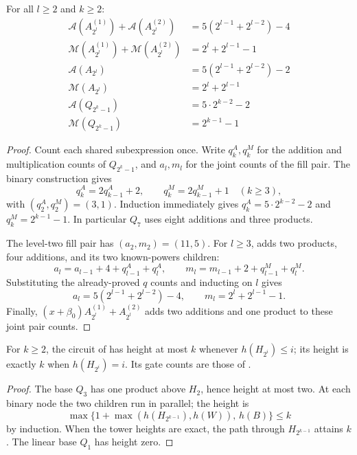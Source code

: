 \begin{lemma}\label{lem:fill-Q-count}
    For all $l\ge 2$ and $k\ge 2$:
    \begin{align}
        \mathcal{A}(A^{(1)}_{2^l}) + \mathcal{A}(A^{(2)}_{2^l})
            &= 5(2^{l - 1} + 2^{l - 2}) - 4 \\
        \mathcal{M}(A^{(1)}_{2^l}) + \mathcal{M}(A^{(2)}_{2^l})
            &= 2^l + 2^{l - 1} - 1 \\
        \mathcal{A}(A_{2^l}) &= 5(2^{l - 1} + 2^{l - 2}) - 2 \\
        \mathcal{M}(A_{2^l}) &= 2^l + 2^{l - 1} \\
        \mathcal{A}(Q_{2^k - 1}) &= 5 \cdot 2^{k - 2} - 2 \\
        \mathcal{M}(Q_{2^k - 1}) &= 2^{k - 1} - 1
    \end{align}
\end{lemma}
\begin{proof}
Count each shared subexpression once.  Write $q_k^A,q_k^M$ for the
addition and multiplication counts of $Q_{2^k-1}$, and $a_l,m_l$ for
the joint counts of the fill pair.  The binary construction gives
\begin{equation}
  q_k^A=2q_{k-1}^A+2,\qquad q_k^M=2q_{k-1}^M+1
  \quad(k\ge3),
  \label{eq:count-q-rec}
\end{equation}
with $(q_2^A,q_2^M)=(3,1)$.  Induction immediately gives
$q_k^A=5\cdot2^{k-2}-2$ and $q_k^M=2^{k-1}-1$.
In particular $Q_7$ uses eight additions and three products.

The level-two fill pair has $(a_2,m_2)=(11,5)$.  For $l\ge3$,
 adds two products, four additions, and its two
known-powers children:
\begin{equation}
  a_l=a_{l-1}+4+q_{l-1}^A+q_l^A,\qquad
  m_l=m_{l-1}+2+q_{l-1}^M+q_l^M.
  \label{eq:count-a-rec}
\end{equation}
Substituting the already-proved $q$ counts and inducting on $l$ gives
\[
  a_l=5(2^{l-1}+2^{l-2})-4,\qquad
  m_l=2^l+2^{l-1}-1.
\]
Finally, $(x+\beta_0)A^{(1)}_{2^l}+A^{(2)}_{2^l}$ adds two additions
and one product to these joint pair counts.
\end{proof}

\begin{lemma}
\label{lem:peeled-Q-count}
For $k\ge2$, the circuit of  has height at
most $k$ whenever $h(H_{2^i})\le i$; its height is exactly $k$ when
$h(H_{2^i})=i$.  Its gate counts are those of .
\end{lemma}
\begin{proof}
The base $Q_3$ has one product above $H_2$, hence height at most two.
At each binary node the two children run in parallel; the height is
\[
 \max\{1+\max(h(H_{2^{k-1}}),h(W)),\,h(B)\}\le k
\]
by induction.  When the tower heights are exact, the path through
$H_{2^{k-1}}$ attains $k$.  The linear base $Q_1$ has height zero.
\end{proof}

